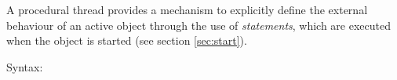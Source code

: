 \documentclass[\pformat,12pt]{article}
\begin{document}
A procedural thread provides a mechanism to explicitly define the
external behaviour of an active object through the use of {\em
statements}, which are executed when the object is started (see
section \ref{sec:start}).  

\begin{description}
\item[Syntax:]  





\end{description}
\end{document}
